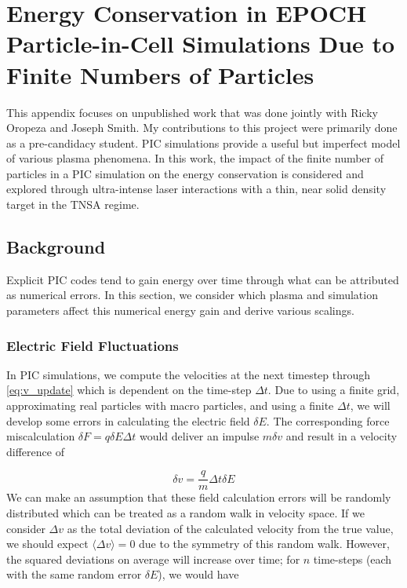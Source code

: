 \chapter{Energy Conservation in EPOCH Particle-in-Cell Simulations Due to Finite Numbers of Particles} \label{sec:app1}
This appendix focuses on unpublished work that was done jointly with Ricky Oropeza and Joseph Smith. My contributions to this project were primarily done as a pre-candidacy student. \gls{PIC} simulations provide a useful but imperfect model of various plasma phenomena. In this work, the impact of the finite number of particles in a PIC simulation on the energy conservation is considered and explored through ultra-intense laser interactions with a thin, near solid density target in the \gls{TNSA} regime. 

\section{Background}

Explicit PIC codes tend to gain energy over time through what can be attributed as numerical errors. In this section, we consider which plasma and simulation parameters affect this numerical energy gain and derive various scalings. 

\subsection{Electric Field Fluctuations}

In PIC simulations, we compute the velocities at the next timestep through \cref{eq:v_update} which is dependent on the time-step $\Delta t$. Due to using a finite grid, approximating real particles with macro particles, and using a finite $\Delta t$, we will develop some errors in calculating the electric field $\delta E$. The corresponding force miscalculation $\delta F = q \delta E \Delta t$ would deliver an impulse $m \delta v$ and result in a velocity difference \cite{Hockney_1988_PIC} of

\begin{equation}
	\delta v = \frac{q}{m} \Delta t \delta E
\end{equation}
We can make an assumption that these field calculation errors will be randomly distributed which can be treated as a random walk in velocity space. If we consider $\Delta v$ as the total deviation of the calculated velocity from the true value, we should expect $\langle \Delta v \rangle = 0$ due to the symmetry of this random walk. However, the squared deviations on average will increase over time; for $n$ time-steps (each with the same random error $\delta E$), we would have 

